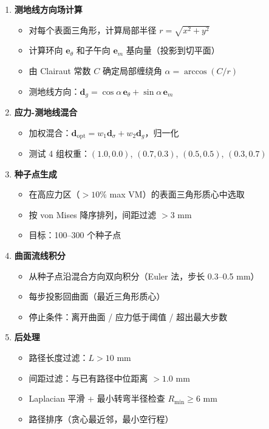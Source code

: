 \documentclass[11pt,a4paper]{article}
\begin{document}
\begin{enumerate}
\item \textbf{测地线方向场计算}
\begin{itemize}[nosep]
\item 对每个表面三角形，计算局部半径 $r = \sqrt{x^2 + y^2}$
\item 计算环向 $\mathbf{e}_\theta$ 和子午向 $\mathbf{e}_m$ 基向量（投影到切平面）
\item 由 Clairaut 常数 $C$ 确定局部缠绕角 $\alpha = \arccos(C/r)$
\item 测地线方向：$\mathbf{d}_g = \cos\alpha\,\mathbf{e}_\theta + \sin\alpha\,\mathbf{e}_m$
\end{itemize}

\item \textbf{应力-测地线混合}
\begin{itemize}[nosep]
\item 加权混合：$\mathbf{d}_{\text{opt}} = w_1 \mathbf{d}_\sigma + w_2 \mathbf{d}_g$，归一化
\item 测试 4 组权重：$(1.0, 0.0)$, $(0.7, 0.3)$, $(0.5, 0.5)$, $(0.3, 0.7)$
\end{itemize}

\item \textbf{种子点生成}
\begin{itemize}[nosep]
\item 在高应力区（$> 10\%$ max VM）的表面三角形质心中选取
\item 按 von Mises 降序排列，间距过滤 $> 3$ mm
\item 目标：100--300 个种子点
\end{itemize}

\item \textbf{曲面流线积分}
\begin{itemize}[nosep]
\item 从种子点沿混合方向双向积分（Euler 法，步长 0.3--0.5 mm）
\item 每步投影回曲面（最近三角形质心）
\item 停止条件：离开曲面 / 应力低于阈值 / 超出最大步数
\end{itemize}

\item \textbf{后处理}
\begin{itemize}[nosep]
\item 路径长度过滤：$L > 10$ mm
\item 间距过滤：与已有路径中位距离 $> 1.0$ mm
\item Laplacian 平滑 + 最小转弯半径检查 $R_{\min} \geq 6$ mm
\item 路径排序（贪心最近邻，最小空行程）
\end{itemize}
\end{enumerate}
\end{document}
